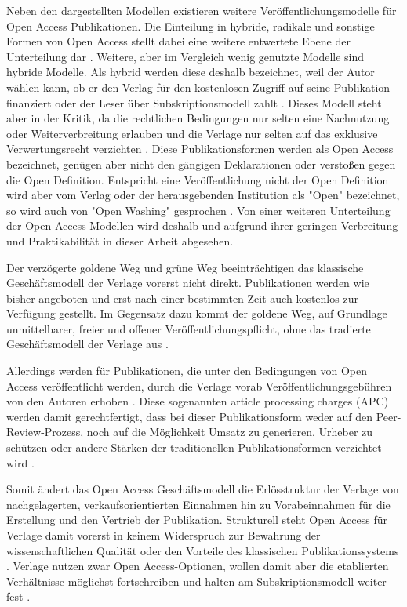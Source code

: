 Neben den dargestellten Modellen existieren weitere Veröffentlichungsmodelle für Open Access Publikationen. Die Einteilung in hybride, radikale und sonstige Formen von Open Access stellt dabei eine weitere entwertete Ebene der Unterteilung dar \cite{Mounce_2015}. Weitere, aber im Vergleich wenig genutzte Modelle sind hybride Modelle. Als hybrid werden diese deshalb bezeichnet, weil der Autor wählen kann, ob er den Verlag für den kostenlosen Zugriff auf seine Publikation finanziert oder der Leser über Subskriptionsmodell zahlt \cite{muller_2010_open}. Dieses Modell steht aber in der Kritik, da die rechtlichen Bedingungen nur selten eine Nachnutzung oder Weiterverbreitung erlauben und die Verlage nur selten auf das exklusive Verwertungsrecht verzichten \cite{muller_2010_open}. Diese Publikationsformen werden als Open Access bezeichnet, genügen aber nicht den gängigen Deklarationen \cite{boai_2012} oder verstoßen gegen die Open Definition. Entspricht eine Veröffentlichung nicht der Open Definition wird aber vom Verlag oder der herausgebenden Institution als "Open" bezeichnet, so wird auch von "Open Washing" gesprochen \cite{suchen}. Von einer weiteren Unterteilung der Open Access Modellen wird deshalb und aufgrund ihrer geringen Verbreitung und Praktikabilität in dieser Arbeit abgesehen.

Der verzögerte goldene Weg und grüne Weg beeinträchtigen das klassische Geschäftsmodell der Verlage vorerst nicht direkt. Publikationen werden wie bisher angeboten und erst nach einer bestimmten Zeit auch kostenlos zur Verfügung gestellt. Im Gegensatz dazu kommt der goldene Weg, auf Grundlage unmittelbarer, freier und offener Veröffentlichungspflicht, ohne das tradierte Geschäftsmodell der Verlage aus \cite{lewis_2012_inevitability}.

Allerdings werden für Publikationen, die unter den Bedingungen von Open Access veröffentlicht werden, durch die Verlage vorab Veröffentlichungsgebühren von den Autoren erhoben \cite{suchen}. Diese sogenannten article processing charges (APC) werden damit gerechtfertigt, dass bei dieser Publikationsform weder auf den Peer-Review-Prozess, noch auf die Möglichkeit Umsatz zu generieren, Urheber zu schützen oder andere Stärken der traditionellen Publikationsformen verzichtet wird \cite{albert_2006_open_implications} \cite{Open_Access_net_2009}.

Somit ändert das Open Access Geschäftsmodell die Erlösstruktur der Verlage von nachgelagerten, verkaufsorientierten Einnahmen hin zu Vorabeinnahmen für die Erstellung und den Vertrieb der Publikation. Strukturell steht Open Access für Verlage damit vorerst in keinem Widerspruch zur Bewahrung der wissenschaftlichen Qualität oder den Vorteile des klassischen Publikationssystems \cite{Suber_2002}. Verlage nutzen zwar Open Access-Optionen, wollen damit aber die etablierten Verhältnisse möglichst fortschreiben und halten am Subskriptionsmodell weiter fest \cite{schmidt_2007_goldenen}.

